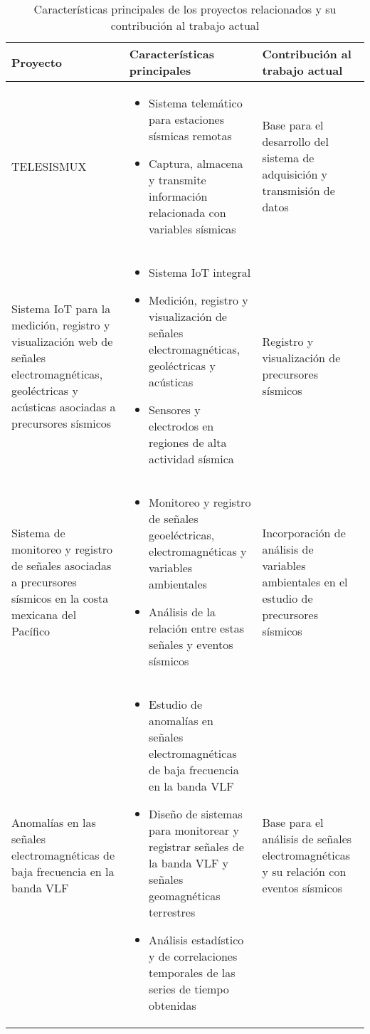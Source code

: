 \begin{table}[h!]
\centering
\begin{tabular}{|p{4cm}|p{8cm}|p{4cm}|}
\hline
\textbf{Proyecto} & \textbf{Características principales} & \textbf{Contribución al trabajo actual} \\ \hline
TELESISMUX & 
\begin{itemize}
  \item Sistema telemático para estaciones sísmicas remotas
  \item Captura, almacena y transmite información relacionada con variables sísmicas
\end{itemize} & 
Base para el desarrollo del sistema de adquisición y transmisión de datos \\ \hline
Sistema IoT para la medición, registro y visualización web de señales electromagnéticas, geoléctricas y acústicas asociadas a precursores sísmicos & 
\begin{itemize}
  \item Sistema IoT integral
  \item Medición, registro y visualización de señales electromagnéticas, geoléctricas y acústicas
  \item Sensores y electrodos en regiones de alta actividad sísmica
\end{itemize} &
Registro y visualización de precursores sísmicos \\ \hline
Sistema de monitoreo y registro de señales asociadas a precursores sísmicos en la costa mexicana del Pacífico & 
\begin{itemize}
  \item Monitoreo y registro de señales geoeléctricas, electromagnéticas y variables ambientales
  \item Análisis de la relación entre estas señales y eventos sísmicos
\end{itemize} &
Incorporación de análisis de variables ambientales en el estudio de precursores sísmicos \\ \hline
Anomalías en las señales electromagnéticas de baja frecuencia en la banda VLF & 
\begin{itemize}
  \item Estudio de anomalías en señales electromagnéticas de baja frecuencia en la banda VLF
  \item Diseño de sistemas para monitorear y registrar señales de la banda VLF y señales geomagnéticas terrestres
  \item Análisis estadístico y de correlaciones temporales de las series de tiempo obtenidas
\end{itemize} &
Base para el análisis de señales electromagnéticas y su relación con eventos sísmicos \\ \hline
\end{tabular}
\caption{Características principales de los proyectos relacionados y su contribución al trabajo actual}
\label{tab:proyectos_relacionados}
\end{table}
\clearpage